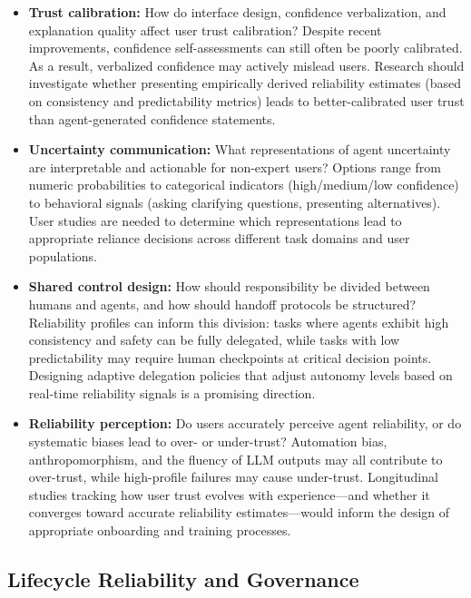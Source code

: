 \documentclass[11pt]{article}
\begin{document}
\begin{itemize}[leftmargin=*]
    \item \textbf{Trust calibration:} How do interface design, confidence verbalization, and explanation quality affect user trust calibration?
   Despite recent improvements, confidence self-assessments can still often be poorly calibrated. As a result, verbalized confidence may actively mislead users.
    Research should investigate whether presenting empirically derived reliability estimates (based on consistency and predictability metrics) leads to better-calibrated user trust than agent-generated confidence statements.

    \item \textbf{Uncertainty communication:} What representations of agent uncertainty are interpretable and actionable for non-expert users?
    Options range from numeric probabilities to categorical indicators (high/medium/low confidence) to behavioral signals (asking clarifying questions, presenting alternatives).
    User studies are needed to determine which representations lead to appropriate reliance decisions across different task domains and user populations.

    \item \textbf{Shared control design:} How should responsibility be divided between humans and agents, and how should handoff protocols be structured?
    Reliability profiles can inform this division: tasks where agents exhibit high consistency and safety can be fully delegated, while tasks with low predictability may require human checkpoints at critical decision points.
    Designing adaptive delegation policies that adjust autonomy levels based on real-time reliability signals is a promising direction.

    \item \textbf{Reliability perception:} Do users accurately perceive agent reliability, or do systematic biases lead to over- or under-trust?
    Automation bias, anthropomorphism, and the fluency of LLM outputs may all contribute to over-trust, while high-profile failures may cause under-trust.
    Longitudinal studies tracking how user trust evolves with experience---and whether it converges toward accurate reliability estimates---would inform the design of appropriate onboarding and training processes.
\end{itemize}

\subsection{Lifecycle Reliability and Governance}
\end{document}

